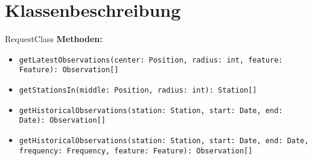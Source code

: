 \section{Klassenbeschreibung}

\begin{Class}{RequestClass}
    \textbf{Methoden:}
    \begin{itemize}
        \item \texttt{getLatestObservations(center: Position, radius: int, feature: Feature): Observation[]}
        \item \texttt{getStationsIn(middle: Position, radius: int): Station[]}
        \item \texttt{getHistoricalObservations(station: Station, start: Date, end: Date): Observation[]}
        \item \texttt{getHistoricalObservations(station: Station, start: Date, end: Date, frequency: Frequency, feature: Feature): Observation[]}
        
    \end{itemize}
\end{Class}